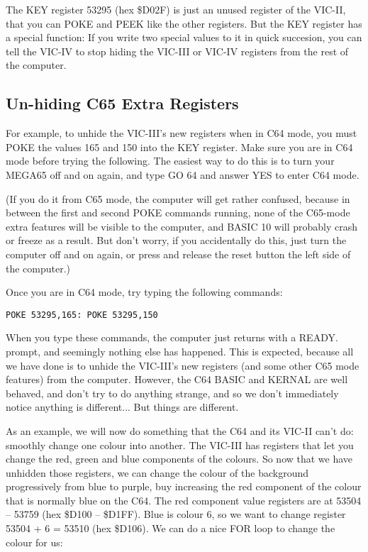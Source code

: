 The KEY register 53295 (hex \$D02F) is just an unused register of the VIC-II, that you can POKE and
PEEK like the other registers.  But the KEY register has a special function: If
you write two special values to it in quick succesion, you can tell the VIC-IV
to stop hiding the VIC-III or VIC-IV registers from the rest of the computer.

\subsection{Un-hiding C65 Extra Registers}

For example, to unhide the VIC-III's new registers when in C64 mode, you must POKE the values 165 and 150
into the KEY register. Make sure you are in C64 mode before trying the following.  The easiest way to do this
is to turn your MEGA65 off and on again, and type GO 64 and answer YES to enter C64 mode.

(If you do it from
C65 mode, the computer will get rather confused, because in between the first and second POKE commands running,
none of the C65-mode extra features will be visible to the computer, and BASIC 10 will probably crash or
freeze as a result. But don't worry, if you accidentally do this, just turn the computer off and on again,
or press and release the reset button the left side of the computer.)

Once you are in C64 mode, try typing the following commands:

\begin{tcolorbox}[colback=black,coltext=white]
\verbatimfont{\codefont}
\begin{verbatim}
POKE 53295,165: POKE 53295,150
\end{verbatim}
\end{tcolorbox}

When you type these commands, the computer just returns with a READY. prompt, and seemingly nothing else has
happened.  This is expected, because all we have done is to unhide the VIC-III's new registers (and some other
C65 mode features) from the computer.  However, the C64 BASIC and KERNAL are well behaved, and don't try to
do anything strange, and so we don't immediately notice anything is different... But things are different.

As an example, we will now do something that the C64 and its VIC-II can't do: smoothly change one colour into another.
The VIC-III has registers that let you change the red, green and blue components of the colours.  So now that we have
unhidden those registers, we can change the colour of the background progressively from blue to purple, buy increasing
the red component of the colour that is normally blue on the C64.  The red component value registers are at
53504 -- 53759 (hex \$D100 -- \$D1FF).  Blue is colour 6, so we want to change register 53504 + 6 = 53510 (hex \$D106).
We can do a nice FOR loop to change the colour for us:

